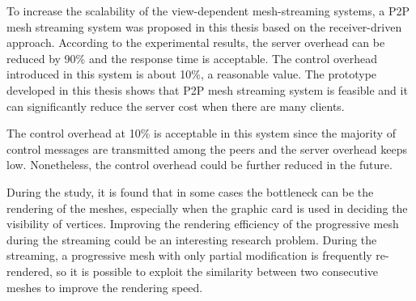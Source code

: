 \documentclass[11pt, a4paper]{report}
\begin{document}
To increase the scalability of the view-dependent mesh-streaming systems, 
a P2P mesh streaming system was proposed in this thesis based on the receiver-driven approach. 
According to the experimental results, the server overhead can be reduced by 90\%
and the response time is acceptable. %
The control overhead introduced in this system is about 10\%, a reasonable value. 
The prototype developed in this thesis shows that P2P mesh streaming system is feasible
and it can significantly reduce the server cost when there are many clients.

The control overhead at 10\% is acceptable in this system since the majority of
control messages are transmitted among the peers and the server overhead keeps low. 
Nonetheless, the control overhead could be further reduced in the future. 

During the study, it is found that in some cases the bottleneck can be the rendering of the meshes, 
especially when the graphic card is used in deciding the visibility of vertices. 
Improving the rendering efficiency of the progressive mesh during the streaming 
could be an interesting research problem.  
During the streaming, a progressive mesh with only partial modification is frequently re-rendered, 
so it is possible to exploit the similarity between two consecutive meshes to improve the rendering speed.


\end{document}
